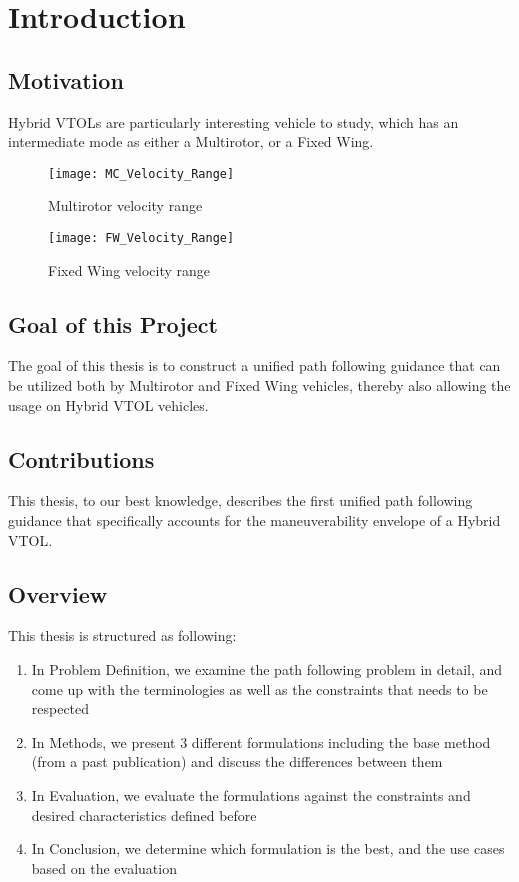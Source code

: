 \chapter{Introduction}
\label{sec:introduction}

\section{Motivation}
Hybrid VTOLs are particularly interesting vehicle to study, which has an intermediate mode as either a Multirotor, or a Fixed Wing.

\begin{figure}[h]
\centering
\texttt{[image: MC\_Velocity\_Range]}
\caption{Multirotor velocity range}
\end{figure}

\begin{figure}[h]
\centering
\texttt{[image: FW\_Velocity\_Range]}
\caption{Fixed Wing velocity range}
\end{figure}

\section{Goal of this Project}
The goal of this thesis is to construct a unified path following guidance that can be utilized both by Multirotor and Fixed Wing vehicles, thereby also allowing the usage on Hybrid VTOL vehicles.

\section{Contributions}
This thesis, to our best knowledge, describes the first unified path following guidance that specifically accounts for the maneuverability envelope of a Hybrid VTOL.

\section{Overview}
This thesis is structured as following:

\begin{enumerate}
    \item In Problem Definition, we examine the path following problem in detail, and come up with the terminologies as well as the constraints that needs to be respected
    \item In Methods, we present 3 different formulations including the base method (from a past publication) and discuss the differences between them
    \item In Evaluation, we evaluate the formulations against the constraints and desired characteristics defined before
    \item In Conclusion, we determine which formulation is the best, and the use cases based on the evaluation
\end{enumerate}